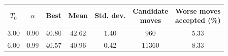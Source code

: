 \begin{tabular}{ccccccc}
\toprule
$T_0$ & $\alpha$ & Best & Mean & Std. dev. & \makecell{Candidate\\moves} & \makecell{Worse moves\\accepted (\%)} \\
\midrule
3.00 & 0.90 & 40.80 & 42.62 & 1.40 & 960 & 5.33 \\
6.00 & 0.99 & 40.57 & 40.96 & 0.42 & 11360 & 8.33 \\
\bottomrule
\end{tabular}
